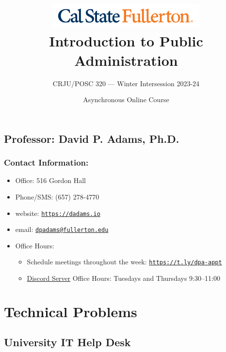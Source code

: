 \documentclass[12pt, letterpaper]{article}
\begin{document}
\title{\includegraphics[width=8cm]{csuf_logo.png} \\ \textbf{Introduction to Public Administration}}

\author{CRJU/POSC 320 — Winter Intersession 2023-24}
\date{Asynchronous Online Course}

    \maketitle


\subsection*{Professor: David P. Adams, Ph.D.}

\subsubsection*{Contact Information:}

\begin{itemize}
	\item Office: 516 Gordon Hall
	\item Phone/SMS: (657) 278-4770
	\item website: \href{https://dadams.io}{\texttt{https://dadams.io}}
	\item email: \href{dpadams@fullerton.edu}{\texttt{dpadams@fullerton.edu}}
	\item Office Hours:
        \begin{itemize}
            \item Schedule meetings throughout the week: \href{https://t.ly/dpa-appt}{\texttt{https://t.ly/dpa-appt}}
            \item \href{https://discord.gg/pKjbtWydxm}{Discord Server} Office Hours: Tuesdays and Thursdays 9:30--11:00
        \end{itemize}
\end{itemize}


\section*{Technical Problems}

\subsection*{University IT Help Desk}
\end{document}
